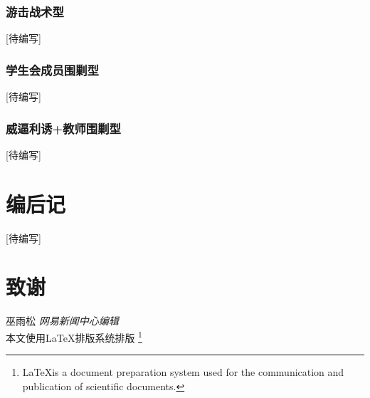 \documentclass[UTF8]{ctexart}
\begin{document}
\subsubsection{游击战术型}
[待编写]
\subsubsection{学生会成员围剿型}
[待编写]
\subsubsection{威逼利诱+教师围剿型}
[待编写]

\section{编后记}
	[待编写]
\section{致谢}
巫雨松  \textit{网易新闻中心编辑}\\
\dag 本文使用\LaTeX 排版系统排版
\footnote{\ddag\LaTeX is a document preparation system used for the communication and publication of scientific documents.}
\end{document}
